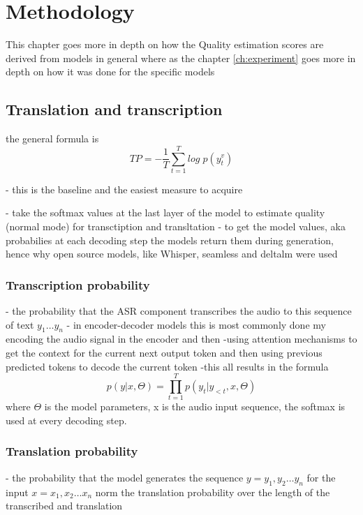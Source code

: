 
\chapter{Methodology}
\label{ch:methods}
This chapter goes more in depth on how the Quality estimation scores are derived from models in general where as the chapter \ref{ch:experiment} goes more in depth on how it was done for the specific models

\section{Translation and transcription}
the general formula is $$TP=-\frac{1}{T}\sum_{t=1}^T log\; p(y_t^v)$$

- this is the baseline and the easiest measure to acquire

- take the softmax values at the last layer of the model to estimate quality (normal mode) for transctiption and transltation 
- to get the model values, aka probabilies at each decoding step the models return them during generation, hence why open source models, like Whisper, seamless and deltalm were used

\subsection{Transcription probability}
- the probability that the ASR component transcribes the audio to this sequence of text $y_1\dots y_n$ 
- in encoder-decoder models this is most commonly done my encoding the audio signal in the encoder and then -using attention mechanisms to get the context for the current next output token and then using previous predicted tokens to decode the current token
-this all results in the formula $$p(y|x,\Theta)=\prod_{t=1}^T p(y_t|y_{<t}, x, \Theta) $$ where $\Theta$ is the model parameters, x is the audio input sequence, the softmax is used at every decoding step.

\subsection{Translation probability}
- the probability that the model generates the sequence $y = y_1, y_2 \dots y_n$ for the input $x=x_1, x_2 \dots x_n$
norm the translation probability over the length of the transcribed and translation 


